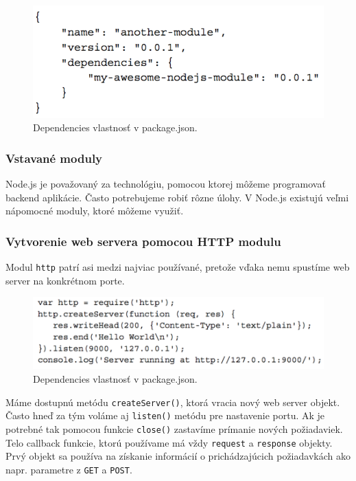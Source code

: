 \begin{figure}[H]
  \centering
  \includegraphics[scale=0.7]{img/npm/npm-overview-dependency.png}
   \caption{Dependencies vlastnosť v package.json.}
  \label{img-npm-dependencies}
\end{figure}

\subsubsection{Vstavané moduly}
Node.js je považovaný za technológiu, pomocou ktorej môžeme programovať backend aplikácie. Často potrebujeme robiť rôzne úlohy. V Node.js existujú veľmi nápomocné moduly, ktoré môžeme využiť.\cite{nodejs-by-example}

\subsubsection{Vytvorenie web servera pomocou HTTP modulu}
Modul \verb|http| patrí asi medzi najviac používané, pretože vďaka nemu spustíme web server na konkrétnom porte.

\begin{figure}[H]
  \centering
  \includegraphics[scale=0.7]{img/npm/npm-http-module.png}
  \caption{Dependencies vlastnosť v package.json.}
  \label{img-npm-http}
\end{figure}

Máme dostupnú metódu \verb|createServer()|, ktorá vracia nový web server objekt. Často hneď za tým voláme aj \verb|listen()| metódu pre nastavenie portu. Ak je potrebné tak pomocou funkcie \verb|close()| zastavíme prímanie nových požiadaviek. Telo callback funkcie, ktorú používame má vždy \verb|request| a \verb|response| objekty. Prvý objekt sa používa na získanie informácií o prichádzajúcich požiadavkách ako napr. parametre z \verb|GET| a \verb|POST|.\cite{nodejs-by-example}


